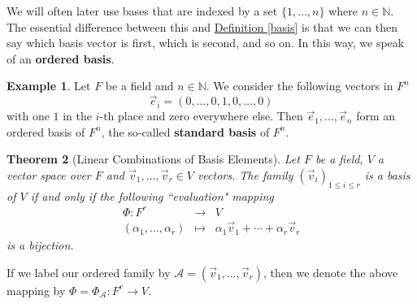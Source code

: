 \documentclass[11pt]{amsbook}
\newtheorem{theorem}{Theorem}[section]
\theoremstyle{definition}
\newtheorem{ex}[theorem]{Example}
\begin{document}
We will often later use bases that are indexed by a set $\{1 , \ldots , n\}$ where $n\in \mathbb{N}$. The essential difference between this and \hyperref[basis]{Definition \ref{basis}} is that we can then say which basis vector is first, which is second, and so on. In this way, we speak of an {\bf ordered basis}.

\begin{ex}\label{standard} Let $F$ be a field and $n\in \mathbb{N}$. We consider the following vectors in $F^n$ $$\vec{e}_i = ( 0, \ldots , 0, 1, 0, \ldots , 0)$$ with one $1$ in the $i$-th place and zero everywhere else. Then $\vec{e}_1, \ldots , \vec{e}_n$ form an ordered basis of $F^n$, the so-called {\bf standard basis} of $F^n$.
\end{ex}

\begin{theorem}[Linear Combinations of Basis Elements]  \label{lincombiso} Let $F$ be a field, $V$ a vector space over $F$ and $\vec{v}_1, \ldots , \vec{v}_r\in V$ vectors. The family $(\vec{v}_i)_{1\leqslant i \leqslant r}$ is a basis of $V$ if and only if the following ``evaluation" mapping \begin{eqnarray*} \Phi : F^r &\to&  V \\ (\alpha_1, \ldots , \alpha_r) & \mapsto & \alpha_1 \vec{v}_1 + \cdots + \alpha_r \vec{v}_r \end{eqnarray*} is a bijection.
\end{theorem}

If we label our ordered family by $\mathcal{A} = ( \vec{v}_1, \ldots , \vec{v}_r)$, then we denote the above mapping by $\Phi = \Phi_{\mathcal{A}}: F^r \to V.$
\end{document}
